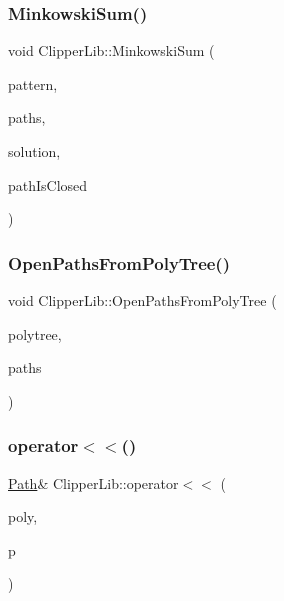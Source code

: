 \subsubsection{\texorpdfstring{MinkowskiSum()}{MinkowskiSum()}\hspace{0.1cm}{\footnotesize\ttfamily [2/2]}}
{\footnotesize\ttfamily void Clipper\+Lib\+::\+Minkowski\+Sum (\begin{DoxyParamCaption}\item[{const \mbox{\hyperlink{namespace_clipper_lib_af39c8fe00f278f18cc8142fef41242da}{Path}} \&}]{pattern,  }\item[{const \mbox{\hyperlink{namespace_clipper_lib_a4bab1d9e10805fa6f1fd3b78c56efcfe}{Paths}} \&}]{paths,  }\item[{\mbox{\hyperlink{namespace_clipper_lib_a4bab1d9e10805fa6f1fd3b78c56efcfe}{Paths}} \&}]{solution,  }\item[{bool}]{path\+Is\+Closed }\end{DoxyParamCaption})}

\mbox{\label{namespace_clipper_lib_aa8b0b36c4c1e8108f39b10e4fba81cc5}} 
\subsubsection{\texorpdfstring{OpenPathsFromPolyTree()}{OpenPathsFromPolyTree()}}
{\footnotesize\ttfamily void Clipper\+Lib\+::\+Open\+Paths\+From\+Poly\+Tree (\begin{DoxyParamCaption}\item[{\mbox{\hyperlink{class_clipper_lib_1_1_poly_tree}{Poly\+Tree}} \&}]{polytree,  }\item[{\mbox{\hyperlink{namespace_clipper_lib_a4bab1d9e10805fa6f1fd3b78c56efcfe}{Paths}} \&}]{paths }\end{DoxyParamCaption})}

\mbox{\label{namespace_clipper_lib_a7783da3ed1c2354e45db83cecc596c7e}} 
\subsubsection{\texorpdfstring{operator$<$$<$()}{operator<<()}\hspace{0.1cm}{\footnotesize\ttfamily [1/5]}}
{\footnotesize\ttfamily \mbox{\hyperlink{namespace_clipper_lib_af39c8fe00f278f18cc8142fef41242da}{Path}}\& Clipper\+Lib\+::operator$<$$<$ (\begin{DoxyParamCaption}\item[{\mbox{\hyperlink{namespace_clipper_lib_af39c8fe00f278f18cc8142fef41242da}{Path}} \&}]{poly,  }\item[{const \mbox{\hyperlink{struct_clipper_lib_1_1_int_point}{Int\+Point}} \&}]{p }\end{DoxyParamCaption})\hspace{0.3cm}{\ttfamily [inline]}}

